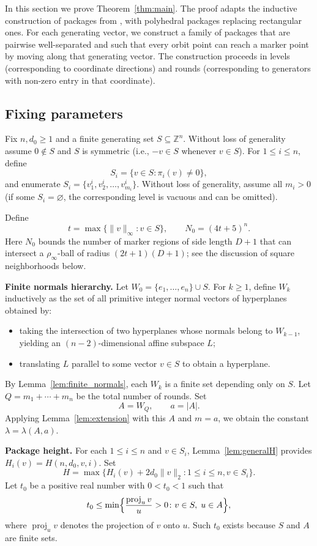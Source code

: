 \documentclass{amsart}
\theoremstyle{definition}
\DeclareMathOperator{\proj}{proj}
\begin{document}
In this section we prove Theorem~\ref{thm:main}. The proof adapts the
inductive construction of packages from \cite{GW25}, with polyhedral
packages replacing rectangular ones. For each generating vector, we
construct a family of packages that are pairwise well-separated and such
that every orbit point can reach a marker point by moving along that
generating vector. The construction proceeds in levels (corresponding
to coordinate directions) and rounds (corresponding to generators with
non-zero entry in that coordinate).

\subsection{Fixing parameters}

Fix $n, d_0\geq 1$ and a finite generating set $S\subseteq\mathbb{Z}^n$.
Without loss of generality assume $0\notin S$ and $S$ is symmetric
(i.e., $-v\in S$ whenever $v\in S$). For $1\leq i\leq n$, define
\[
S_i=\{v\in S\colon \pi_i(v)\neq 0\},
\]
and enumerate $S_i=\{v_1^i, v_2^i, \dots, v_{m_i}^i\}$. Without loss of
generality, assume all $m_i>0$ (if some $S_i=\varnothing$, the corresponding
level is vacuous and can be omitted).

Define
\[
t=\max\{\|v\|_{\infty}\colon v\in S\},\qquad
N_0=(4t+5)^n.
\]
Here $N_0$ bounds the number of marker regions of side length $D+1$
that can intersect a $\rho_\infty$-ball of radius $(2t+1)(D+1)$; see the
discussion of square neighborhoods below.

\medskip\noindent
\textbf{Finite normals hierarchy.}
Let $W_0=\{e_1,\dots,e_n\}\cup S$. For $k\geq 1$, define $W_k$ inductively
as the set of all primitive integer normal vectors of hyperplanes obtained
by:
\begin{itemize}
\item taking the intersection of two hyperplanes whose normals belong to
$W_{k-1}$, yielding an $(n-2)$-dimensional affine subspace $L$;
\item translating $L$ parallel to some vector $v\in S$ to obtain a hyperplane.
\end{itemize}
By Lemma~\ref{lem:finite_normals}, each $W_k$ is a finite set depending
only on $S$. Let $Q=m_1+\cdots+m_n$ be the total number of rounds. Set
\[
A=W_Q,\qquad a=|A|.
\]
Applying Lemma~\ref{lem:extension} with this $A$ and $m=a$, we obtain
the constant $\lambda=\lambda(A,a)$.

\medskip\noindent
\textbf{Package height.}
For each $1\leq i\leq n$ and $v\in S_i$,
Lemma~\ref{lem:generalH} provides $H_i(v)=H(n,d_0,v,i)$. Set
\[
H=\max\{H_i(v)+2d_0\|v\|_2\colon 1\leq i\leq n, v\in S_i\}.
\]
Let $t_0$ be a positive real number with $0<t_0<1$ such that
\[
t_0\leq \min\Bigl\{\frac{\proj_u v}{u}>0\colon
v\in S,\; u\in A\Bigr\},
\]
where $\proj_u v$ denotes the projection of $v$ onto $u$. Such $t_0$
exists because $S$ and $A$ are finite sets.
\end{document}
